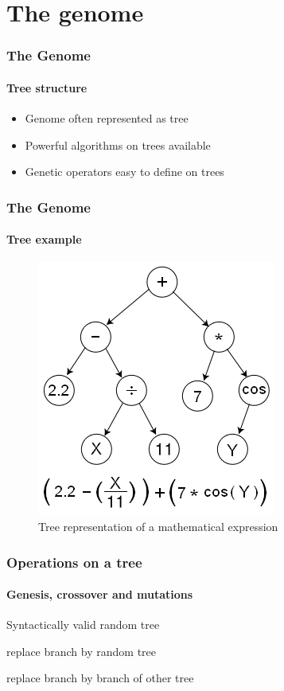 \documentclass{beamer}
\begin{document}


\section{The genome} %
\label{sg:sec:the_genome}

\begin{frame}
	\frametitle{The Genome}
	\framesubtitle{Tree structure}
	\begin{itemize}
		\item<1-> Genome often represented as tree
		\item<2-> Powerful algorithms on trees available
		\item<3-> Genetic operators easy to define on trees
	\end{itemize}
\end{frame}

\begin{frame}
	\frametitle{The Genome}
	\framesubtitle{Tree example}
	\begin{figure}[h]
		\centering
			\includegraphics[width=0.6\textheight]{images/Genetic_Program_Tree.png}
		\caption{Tree representation of a mathematical expression}
		\label{sg:fig:images_Genetic_Program_Tree}
	\end{figure}
\end{frame}

\begin{frame}
	\frametitle{Operations on a tree}
	\framesubtitle{Genesis, crossover and mutations}
	\begin{description}
		\item<1->[Genesis] Syntactically valid random tree
		\item<2->[Mutation] replace branch by random tree
		\item<3->[Crossover] replace branch by branch of other tree
	\end{description}
\end{frame}
\end{document}
